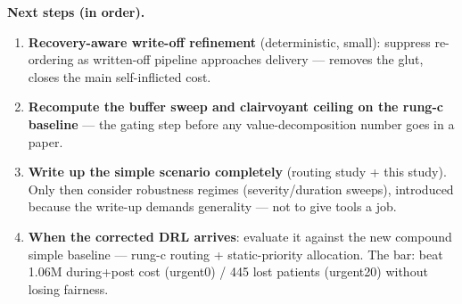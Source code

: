 \documentclass[11pt]{article}
\begin{document}
\textbf{Next steps (in order).}
\begin{enumerate}
\item \textbf{Recovery-aware write-off refinement} (deterministic, small): suppress
re-ordering as written-off pipeline approaches delivery --- removes the glut, closes the main
self-inflicted cost.
\item \textbf{Recompute the buffer sweep and clairvoyant ceiling on the rung-c baseline} ---
the gating step before any value-decomposition number goes in a paper.
\item \textbf{Write up the simple scenario completely} (routing study + this study). Only
then consider robustness regimes (severity/duration sweeps), introduced because the write-up
demands generality --- not to give tools a job.
\item \textbf{When the corrected DRL arrives}: evaluate it against the new compound simple
baseline --- rung-c routing + static-priority allocation. The bar: beat 1.06M during+post
cost (urgent0) / 445 lost patients (urgent20) without losing fairness.
\end{enumerate}
\end{document}
